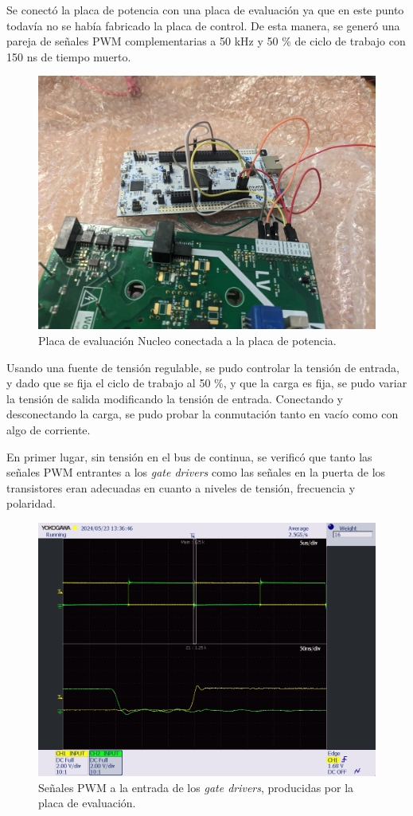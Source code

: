 Se conectó la placa de potencia con una placa de evaluación ya que en este punto todavía no se había fabricado la placa de control. De esta manera, se generó una pareja de señales PWM complementarias a 50 kHz y 50 \% de ciclo de trabajo con 150 ns de tiempo muerto. 
	
\begin{figure}[H]
	\centering
	\includegraphics[width=0.7\linewidth]{fig/nucleoHalfBridge}
	\caption{Placa de evaluación Nucleo conectada a la placa de potencia.}
\end{figure}
Usando una fuente de tensión regulable, se pudo controlar la tensión de entrada, y dado que se fija el ciclo de trabajo al 50 \%, y que la carga es fija, se pudo variar la tensión de salida modificando la tensión de entrada. Conectando y desconectando la carga, se pudo probar la conmutación tanto en vacío como con algo de corriente.


En primer lugar, sin tensión en el bus de continua, se verificó que tanto las señales PWM entrantes a los \textit{gate drivers} como las señales en la puerta de los transistores eran adecuadas en cuanto a niveles de tensión, frecuencia y polaridad.

	
\begin{figure}[H]
	\centering
	\includegraphics[width=0.7\linewidth]{fig/PWM-HSLS}
	\caption{Señales PWM a la entrada de los \textit{gate drivers}, producidas por la placa de evaluación.}
\end{figure}

